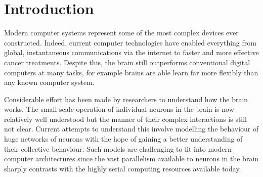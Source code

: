 \chapter{Introduction}
	
	
	Modern computer systems represent some of the most complex devices ever
	constructed. Indeed, current computer technologies have enabled everything
	from global, instantaneous communications via the internet to faster and more
	effective cancer treatments\cite{nassif}. Despite this, the brain still
	outperforms conventional digital computers at many tasks, for example brains
	are able learn far more flexibly than any known computer system.
	
	Considerable effort has been made by researchers to understand how the brain
	works. The small-scale operation of individual neurons in the brain is now
	relatively well understood but the manner of their complex interactions is
	still not clear. Current attempts to understand this involve modelling the
	behaviour of huge networks of neurons with the hope of gaining a better
	understanding of their collective behaviour. Such models are challenging to
	fit into modern computer architectures since the vast parallelism available to
	neurons in the brain sharply contrasts with the highly serial computing
	resources available today.

